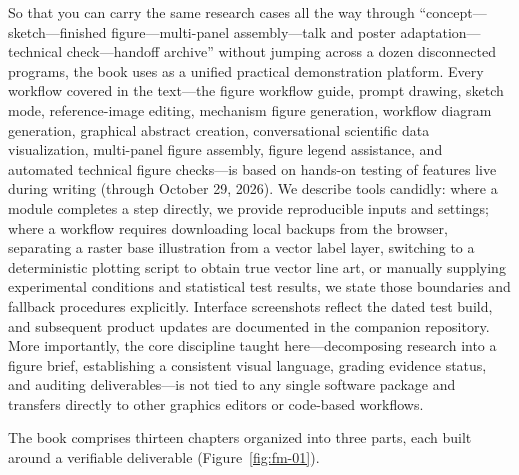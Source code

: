 So that you can carry the same research cases all the way through ``concept---sketch---finished figure---multi-panel assembly---talk and poster adaptation---technical check---handoff archive'' without jumping across a dozen disconnected programs, the book uses \scidraw{} as a unified practical demonstration platform. Every workflow covered in the text---the figure workflow guide, prompt drawing, sketch mode, reference-image editing, mechanism figure generation, workflow diagram generation, graphical abstract creation, conversational scientific data visualization, multi-panel figure assembly, figure legend assistance, and automated technical figure checks---is based on hands-on testing of features live during writing (through October 29, 2026). We describe tools candidly: where a module completes a step directly, we provide reproducible inputs and settings; where a workflow requires downloading local backups from the browser, separating a raster base illustration from a vector label layer, switching to a deterministic plotting script to obtain true vector line art, or manually supplying experimental conditions and statistical test results, we state those boundaries and fallback procedures explicitly. Interface screenshots reflect the dated test build, and subsequent product updates are documented in the companion repository. More importantly, the core discipline taught here---decomposing research into a figure brief, establishing a consistent visual language, grading evidence status, and auditing deliverables---is not tied to any single software package and transfers directly to other graphics editors or code-based workflows.

The book comprises thirteen chapters organized into three parts, each built around a verifiable deliverable (Figure~\ref{fig:fm-01}).


